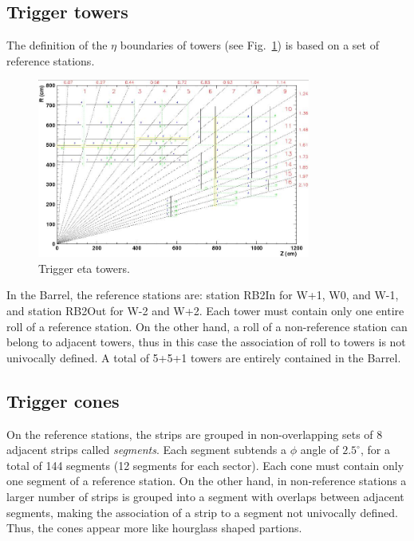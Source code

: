 \subsection{Trigger towers}
The definition of the $\eta$ boundaries 
of towers (see Fig.~\ref{fig:eta_towers}) is based on a set 
of reference stations.

\begin{figure}[hbtp]
  \begin{center}
    \includegraphics[width=0.8\textwidth]{eta_towers}
    \hspace{1cm}
    \caption{Trigger eta towers.}
    \label{fig:eta_towers}
  \end{center}
\end{figure}

In the Barrel, the reference stations are:
station RB2In for W+1, W0, and W-1, 
and station RB2Out for W-2 and W+2. 
Each tower must contain only one entire roll 
of a reference station. On the 
other hand, a roll of a non-reference station
can belong to adjacent towers, thus in this case 
the association of roll to towers is not univocally defined.
A total of 5+5+1 towers are entirely contained in the Barrel.

\subsection{Trigger cones}
On the reference stations, the strips are grouped in
non-overlapping sets of 8 adjacent strips called {\em segments}.
Each segment subtends a $\phi$ angle of $2.5^\circ$, for a total 
of 144 segments (12 segments for each sector).
Each cone must contain only one segment of a reference 
station.
On the other hand, in non-reference stations a larger number
of strips is grouped into a segment with overlaps 
between adjacent segments, making the association of a strip 
to a segment not univocally defined. Thus, the cones appear more 
like hourglass shaped partions.

